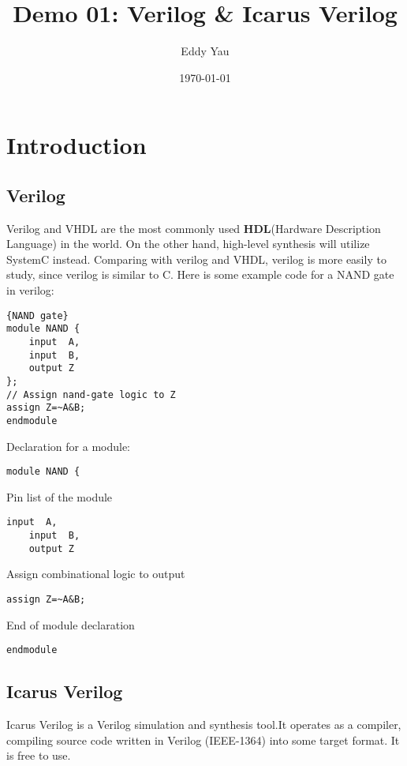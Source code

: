 \documentclass[12pt,a4paper]{article}
\title{Demo 01: Verilog \& Icarus Verilog\vspace{-1ex}}
\author{Eddy Yau\vspace{-2ex}}
\date{\today}
\begin{document}
\maketitle 
\section{Introduction}
\subsection{Verilog}
Verilog and VHDL are the most commonly used \textbf{HDL}(Hardware Description Language) in the world. 
On the other hand, high-level synthesis will utilize SystemC instead. 
Comparing with verilog and VHDL, verilog is more easily to study, since verilog is similar to C.
\newline
Here is some example code for a NAND gate in verilog:

\lstset{tabsize=2,breaklines=true,numbers=left,basicstyle=footnotesize,xleftmargin=30pt}


\begin{lstlisting}[style={verilog-style},frame=single,caption=NAND.v]{NAND gate}
module NAND {
	input  A,
	input  B,
	output Z
};
// Assign nand-gate logic to Z
assign Z=~A&B;
endmodule
\end{lstlisting}

\smallskip
Declaration for a module:
\begin{lstlisting}[style={verilog-style},frame=single,firstnumber=1]
module NAND {
\end{lstlisting}

\smallskip
Pin list of the module
\begin{lstlisting}[style={verilog-style},frame=single,firstnumber=2]
	input  A,
	input  B,
	output Z
\end{lstlisting}

\smallskip
Assign combinational logic to output
\begin{lstlisting}[style={verilog-style},frame=single,firstnumber=7]
assign Z=~A&B;
\end{lstlisting}

\smallskip
End of module declaration
\begin{lstlisting}[style={verilog-style},frame=single,firstnumber=8]
endmodule
\end{lstlisting}
\subsection{Icarus Verilog}
Icarus Verilog is a Verilog simulation and synthesis tool.It operates as a compiler, compiling source code written in Verilog (IEEE-1364) into some target format.\cite{iverilogwebsite} It is free to use.
\end{document}
